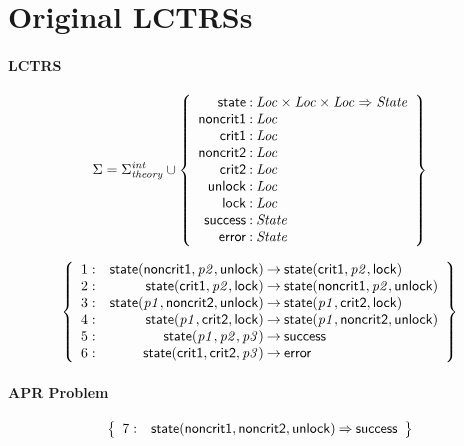 \documentclass[a4paper]{article}
\newcommand{\Sort}[1]{\mathit{#1}}
\newcommand{\symb}[1]{\mathsf{#1}}
\newcommand{\var}[1]{\mathit{#1}}
\newcommand{\Sigmainttheory}{\Sigma^{\mathit{int}}_{\mathit{theory}}}
\begin{document}

\section*{Original LCTRSs}

\paragraph{LCTRS}

\[
\Sigma = 
\Sigmainttheory \cup\left\{
\begin{array}{r@{\>}c@{\>}l}
\symb{state} & : & \Sort{Loc} \times \Sort{Loc} \times \Sort{Loc} \Rightarrow \Sort{State}\\
\symb{noncrit1} & : & \Sort{Loc}\\
\symb{crit1} & : & \Sort{Loc}\\
\symb{noncrit2} & : & \Sort{Loc}\\
\symb{crit2} & : & \Sort{Loc}\\
\symb{unlock} & : & \Sort{Loc}\\
\symb{lock} & : & \Sort{Loc}\\
\symb{success} & : & \Sort{State}\\
\symb{error} & : & \Sort{State}\\
\end{array}
\right\}
\]

\[
\left\{
\begin{array}{rr@{\>}c@{\>}ll}
\mathrm{1} : 
 & \symb{state}(\symb{noncrit1},\var{p2},\symb{unlock})
 & \to 
 & \symb{state}(\symb{crit1},\var{p2},\symb{lock})\\

\mathrm{2} : 
 & \symb{state}(\symb{crit1},\var{p2},\symb{lock})
 & \to 
 & \symb{state}(\symb{noncrit1},\var{p2},\symb{unlock})\\

\mathrm{3} : 
 & \symb{state}(\var{p1},\symb{noncrit2},\symb{unlock})
 & \to 
 & \symb{state}(\var{p1},\symb{crit2},\symb{lock})\\

\mathrm{4} : 
 & \symb{state}(\var{p1},\symb{crit2},\symb{lock})
 & \to 
 & \symb{state}(\var{p1},\symb{noncrit2},\symb{unlock})\\

\mathrm{5} : 
 & \symb{state}(\var{p1},\var{p2},\var{p3})
 & \to 
 & \symb{success}\\

\mathrm{6} : 
 & \symb{state}(\symb{crit1},\symb{crit2},\var{p3})
 & \to 
 & \symb{error}\\

\end{array}
\right\}
\]


\paragraph{APR Problem}

\[
\left\{
\begin{array}{rr@{\>}c@{\>}ll}
\mathrm{7} : 
 & \symb{state}(\symb{noncrit1},\symb{noncrit2},\symb{unlock})
 & \Rightarrow 
 & \symb{success}\\

\end{array}
\right\}
\]
\end{document}
